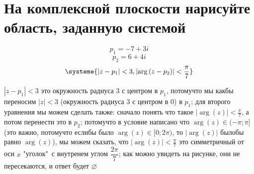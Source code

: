 \documentclass{article}
\newcommand{\ds}{\displaystyle}
\newcommand{\abs}[1]{\left|#1\right|}
\newcommand{\Arg}[1]{\arg\left(#1\right)}
\begin{document}
  \section{На комплексной плоскости нарисуйте область, заданную системой}
  $$ p_1 = -7+3i $$
  $$ p_2 = 6+4i $$
  \[
    \systeme{
      \abs{z-p_1} < 3,
      \abs{\Arg{z-p_2}} < \dfrac{\pi}{7}
    }
  \]
  \begin{figure}
    \vspace{-3.25cm}
    \centering
    \vspace{-.5cm}
  \end{figure}
  $\abs{z-p_1} < 3$ это окружность радиуса $3$ с центром в $p_1$,
  потомучто мы какбы переносим $\abs{z} < 3$ (окружность радиуса $3$ с центром в $0$) в $p_1$;
  для второго уравнения мы можем сделать также: сначало понять что такое $\ds \abs{\Arg{z}} < \frac{\pi}{7}$,
  а потом перенести это в $p_2$;
  потомучто в условие написано что $\Arg{z} \in (-\pi;\pi]$
  (это важно, потомучто еслибы было $\Arg{z} \in [0;2\pi)$, то $\abs{\Arg{z}}$ былобы равно $\Arg{z}$),
  мы можем сказать, что $\ds \abs{\Arg{z}} < \frac{\pi}{7}$ это симметричный от оси $x$ "уголок"\ с внутренем углом $\dfrac{2\pi}{7}$;
  как можно увидеть на рисунке, они не пересекаются, и ответ будет $\varnothing$
\end{document}
